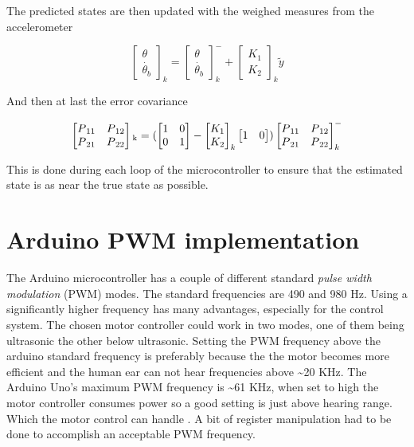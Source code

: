 \documentclass[a4paper,11pt]{kth-mag}
\begin{document}
The predicted states are then updated with the weighed measures from the accelerometer

\begin{equation}
\begin{bmatrix}
\theta \\
\dot{\theta_b}
\end{bmatrix}_k
=
\begin{bmatrix}
\theta \\
\dot{\theta_b}
\end{bmatrix}_k^-
+
\begin{bmatrix}
K_1 \\ K_2
\end{bmatrix}_k
\textbf{$\tilde{y}$}
\end{equation}

And then at last the error covariance

\begin{equation}
\begin{bmatrix}
P\textsubscript{11} & P\textsubscript{12} \\
P\textsubscript{21} & P\textsubscript{22}
\end{bmatrix}\textsubscript{k} 
=(
 \begin{bmatrix}
1 & 0 \\
0 & 1
\end{bmatrix}
-
\begin{bmatrix}
K_1 \\ K_2
\end{bmatrix}_k
\begin{bmatrix}
1 & 0
\end{bmatrix}
)
\begin{bmatrix}
P\textsubscript{11} & P\textsubscript{12} \\
P\textsubscript{21} & P\textsubscript{22}
\end{bmatrix}^-_k
\end{equation}


This is done during each loop of the microcontroller to ensure that the estimated state is as near the true state as possible.

\section{Arduino PWM implementation} \label{app: PWM}
The Arduino microcontroller has a couple of different standard \textit{pulse width modulation} (PWM) modes. The standard frequencies are 490 and 980 Hz. Using a significantly higher frequency has many advantages, especially for the control system. The chosen motor controller could work in two modes, one of them being ultrasonic the other below ultrasonic. Setting the PWM frequency above the arduino standard frequency is preferably because the the motor becomes more efficient \cite{pwmeff} and the human ear can not hear frequencies above \textasciitilde 20 KHz. The Arduino Uno's maximum PWM frequency is \textasciitilde 61 KHz, when set to high the motor controller consumes power so a good setting is just above hearing range. Which the motor control can handle \cite{MC33926}. A bit of register manipulation had to be 
done to accomplish an acceptable PWM frequency.
\end{document}
